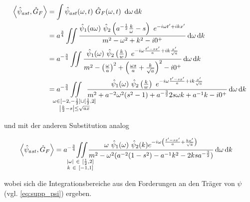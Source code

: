 \documentclass{scrartcl}
\begin{document}
\begin{align}
\left< \hat\psi_{ast}, \hat G_F \right> &=
    \int \hat \psi_{ast}(\omega, t) ~\hat G_F(\omega, t) ~\d \omega \d k
    \nonumber \\
    &=
    a^{\frac{3}{4}} \iint \frac{
        \hat \psi_1 (a \omega)
        ~\hat \psi_2 \left(a^{-\frac{1}{2}}\frac{k}{\omega} - s\right)
        ~ e^{-i\omega t' + i k x'}
    }
    {
        m^2 - \omega^2 + k^2 - i 0^+
    }
    \d \omega \d k
    \nonumber \\
    &=
    a^{-\frac{3}{4}} \iint \frac{
        \hat\psi_1(\omega)
        ~\hat \psi_2\left(\tfrac{k}{w}\right)
        ~e^{-i \omega \frac{t' - sx'}{a} + ik \frac{x'}{\sqrt{a}}}
    }
    {
        m^2 - \left(\frac{\omega}{a}\right)^2
        + \left(\frac{\omega s}{a} + \frac{k}{\sqrt{a}}\right)^2 - i0^+
    }
    \d \omega \d k \nonumber \\
    &=
    a^{-\frac{3}{4}}
    \kern -2em \iint
    \limits_{
    \substack{
        \omega \in [-2, -\frac{1}{2}]\cup[\frac{1}{2},2] \\
        \left|\frac{k}{2}-s\right| \leq \sqrt{ax}
        }
    }
    \kern -1.5em
    \frac{
        \hat\psi_1(\omega)
        ~\hat \psi_2\left(\tfrac{k}{w}\right)
        ~e^{-i \omega \frac{t' - sx'}{a} + ik \frac{x'}{\sqrt{a}}}
    }
    {
        m^2 + a^{-2} \omega^2 (s^2 - 1) + a^{-\frac{3}{2}} 2 s \omega k + a^{-1} k  - i0^+
    }
    \d \omega \d k
    \label{eq:psi_ast_gf_1}
\end{align}


und mit der anderen Substitution analog

\begin{align}
    \left< \hat\psi_{ast}, \hat G_F \right>
    &=
    a^{-\frac{3}{4}}
    \kern -1em
    \iint \limits_{\substack{
        |\omega|~ \in~ [\frac{1}{2},2] \\
        k ~\in~ [-1,1]
        }
    }
    \kern -1em
    \frac{
        \omega ~\hat \psi_1(\omega) ~\hat \psi_2(k)
        e^{-i \omega \left(\frac{t' - sx'}{a} + \frac{kx'}{\sqrt{a}}\right)}
    }
    {
        m^2 - \omega^2(a^{-2}(1-s^2)-a^{-1}k^2 - 2 k s a^{-\frac{3}{2}})
    }
    \d \omega \d k
    \label{eq:psi_ast_gf_2}
\end{align}

wobei sich die Integrationsbereiche aus den Forderungen an den Träger von $\psi$
(vgl. \eqref{eq:supp_psi}) ergeben.
\end{document}
